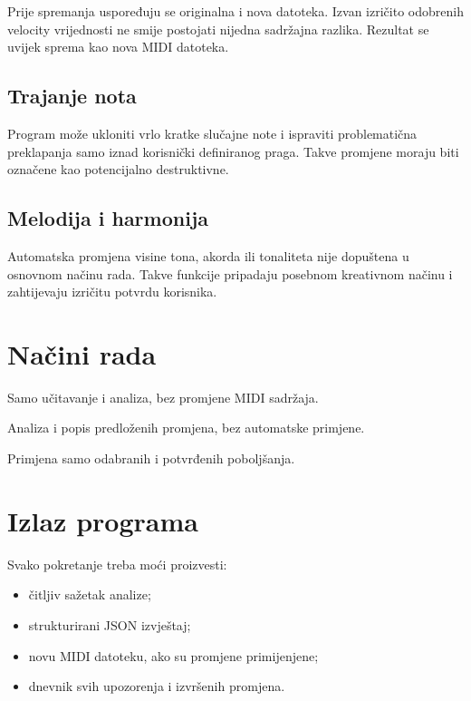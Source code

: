 \documentclass[11pt]{article}
\begin{document}
Prije spremanja uspoređuju se originalna i nova datoteka. Izvan izričito
odobrenih velocity vrijednosti ne smije postojati nijedna sadržajna razlika.
Rezultat se uvijek sprema kao nova MIDI datoteka.

\subsection{Trajanje nota}

Program može ukloniti vrlo kratke slučajne note i ispraviti problematična
preklapanja samo iznad korisnički definiranog praga. Takve promjene moraju biti
označene kao potencijalno destruktivne.

\subsection{Melodija i harmonija}

Automatska promjena visine tona, akorda ili tonaliteta nije dopuštena u
osnovnom načinu rada. Takve funkcije pripadaju posebnom kreativnom načinu i
zahtijevaju izričitu potvrdu korisnika.

\section{Načini rada}

\begin{description}[style=nextline]
    \item[Analyze] Samo učitavanje i analiza, bez promjene MIDI sadržaja.
    \item[Suggest] Analiza i popis predloženih promjena, bez automatske primjene.
    \item[Enhance] Primjena samo odabranih i potvrđenih poboljšanja.
\end{description}

\section{Izlaz programa}

Svako pokretanje treba moći proizvesti:

\begin{itemize}
    \item čitljiv sažetak analize;
    \item strukturirani JSON izvještaj;
    \item novu MIDI datoteku, ako su promjene primijenjene;
    \item dnevnik svih upozorenja i izvršenih promjena.
\end{itemize}
\end{document}

